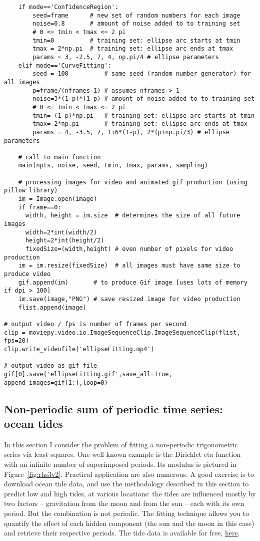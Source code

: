 \documentclass[oneside,10pt]{book}
\begin{document}
\begin{lstlisting}
    if mode=='ConfidenceRegion':
        seed=frame      # new set of random numbers for each image
        noise=0.8       # amount of noise added to to training set
        # 0 <= tmin < tmax <= 2 pi
        tmin=0          # training set: ellipse arc starts at tmin
        tmax = 2*np.pi  # training set: ellipse arc ends at tmax
        params = 3, -2.5, 7, 4, np.pi/4 # ellipse parameters
    elif mode=='CurveFitting':
        seed = 100          # same seed (random number generator) for all images
        p=frame/(nframes-1) # assumes nframes > 1
        noise=3*(1-p)*(1-p) # amount of noise added to to training set
        # 0 <= tmin < tmax <= 2 pi
        tmin= (1-p)*np.pi   # training set: ellipse arc starts at tmin
        tmax= 2*np.pi       # training set: ellipse arc ends at tmax
        params = 4, -3.5, 7, 1+6*(1-p), 2*(p+np.pi/3) # ellipse parameters

    # call to main function
    main(npts, noise, seed, tmin, tmax, params, sampling)

    # processing images for video and animated gif production (using pillow library)
    im = Image.open(image)
    if frame==0:
      width, height = im.size  # determines the size of all future images
      width=2*int(width/2)
      height=2*int(height/2)
      fixedSize=(width,height) # even number of pixels for video production
    im = im.resize(fixedSize)  # all images must have same size to produce video
    gif.append(im)       # to produce Gif image [uses lots of memory if dpi > 100]
    im.save(image,"PNG") # save resized image for video production
    flist.append(image)

# output video / fps is number of frames per second
clip = moviepy.video.io.ImageSequenceClip.ImageSequenceClip(flist, fps=20)
clip.write_videofile('ellipseFitting.mp4')

# output video as gif file
gif[0].save('ellipseFitting.gif',save_all=True, append_images=gif[1:],loop=0)
\end{lstlisting}

\subsection{Non-periodic sum of periodic time series: ocean tides}\label{tidesofheav}

In this section I consider the problem of fitting a \textcolor{index}{non-periodic trigonometric series} via least squares. One  well known example
is the Dirichlet eta function with an infinite number of superimposed periods. Its modulus is pictured in Figure~\ref{fig:rhs3v2}.
Practical application are also numerous. A good exercise
 is to download ocean tide data, and use the methodology described in this section to predict low and high tides, at various locations: the tides are influenced mostly by two factors --
 gravitation from the moon and from the sun -- each with its own period. But the combination is not periodic. The fitting technique allows you
 to quantify the effect of each hidden component (the sun and the moon in this case) and retrieve their respective periods.
The tide data is available
 for free, \href{https://tidesandcurrents.noaa.gov/}{here}.
\end{document}

